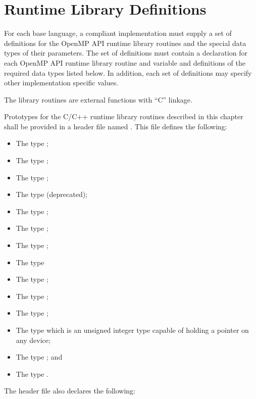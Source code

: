 \section{Runtime Library Definitions}
\label{sec:runtime library definitions}
For each base language, a compliant implementation must supply a set of 
definitions for the OpenMP API runtime library routines and the special 
data types of their parameters. The set of definitions must contain a 
declaration for each OpenMP API runtime library routine and variable and 
definitions of the required data types listed below. In addition, each 
set of definitions may specify other implementation specific values.

\begin{ccppspecific}
The library routines are external functions with ``C'' linkage.

Prototypes for the C/C++ runtime library routines described in this 
chapter shall be provided in a header file named . This 
file defines the following:

\begin{itemize}
\item The type ;
\item The type ;
\item The type ;
\item The type  (deprecated);
\item The type ;
\item The type ;
\item The type ;
\item The type 
\item The type ;
\item The type ;
\item The type ;
\item The type  which is an unsigned integer type 
      capable of   holding a pointer on any device;
\item The type ; and
\item The type .
\end{itemize}

The header file also declares the following:


\end{ccppspecific}

